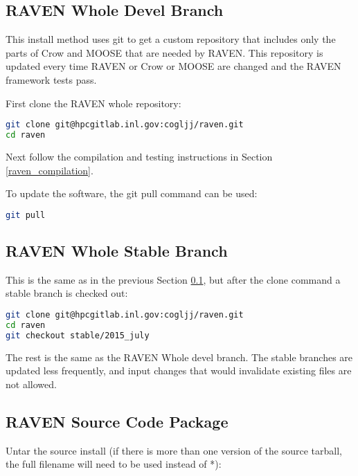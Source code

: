 \subsection{RAVEN Whole Devel Branch}
\label{raven_whole_devel}

This install method uses git to get a custom repository that includes
only the parts of Crow and MOOSE that are needed by RAVEN.  This
repository is updated every time RAVEN or Crow or MOOSE are changed
and the RAVEN framework tests pass.

First clone the RAVEN whole repository:

\begin{lstlisting}[language=bash]
git clone git@hpcgitlab.inl.gov:cogljj/raven.git
cd raven
\end{lstlisting}

Next follow the compilation and testing instructions in Section \ref{raven_compilation}.

To update the software, the git pull command can be used:

\begin{lstlisting}[language=bash]
git pull
\end{lstlisting}

\subsection{RAVEN Whole Stable Branch}
\label{raven_whole_stable}

This is the same as in the previous Section \ref{raven_whole_devel},
but after the clone command a stable branch is checked out:

\begin{lstlisting}[language=bash]
git clone git@hpcgitlab.inl.gov:cogljj/raven.git
cd raven
git checkout stable/2015_july
\end{lstlisting}

The rest is the same as the RAVEN Whole devel branch.  The stable
branches are updated less frequently, and input changes that would
invalidate existing files are not allowed.

\subsection{RAVEN Source Code Package}
\label{raven_source_package}

Untar the source install (if there is more than one version of the
source tarball, the full filename will need to be used instead of *):

